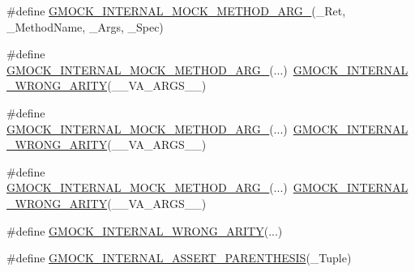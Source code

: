 \begin{DoxyCompactItemize}
\item 
\#define \mbox{\hyperlink{_obj__test_2lib_2googletest-master_2googlemock_2include_2gmock_2gmock-function-mocker_8h_ad8a2523f8167f8c85b082c8c65f31b87}{G\+M\+O\+C\+K\+\_\+\+I\+N\+T\+E\+R\+N\+A\+L\+\_\+\+M\+O\+C\+K\+\_\+\+M\+E\+T\+H\+O\+D\+\_\+\+A\+R\+G\+\_}}(\+\_\+\+Ret,  \+\_\+\+Method\+Name,  \+\_\+\+Args,  \+\_\+\+Spec)
\item 
\#define \mbox{\hyperlink{_obj__test_2lib_2googletest-master_2googlemock_2include_2gmock_2gmock-function-mocker_8h_a761ee1701ece858571b5d950cb6de86a}{G\+M\+O\+C\+K\+\_\+\+I\+N\+T\+E\+R\+N\+A\+L\+\_\+\+M\+O\+C\+K\+\_\+\+M\+E\+T\+H\+O\+D\+\_\+\+A\+R\+G\+\_}}(...)~\mbox{\hyperlink{_obj__test_2lib_2googletest-master_2googlemock_2include_2gmock_2gmock-function-mocker_8h_a592456f4bfcfc9a9a3a6b1482ed569f4}{G\+M\+O\+C\+K\+\_\+\+I\+N\+T\+E\+R\+N\+A\+L\+\_\+\+W\+R\+O\+N\+G\+\_\+\+A\+R\+I\+TY}}(\+\_\+\+\_\+\+V\+A\+\_\+\+A\+R\+G\+S\+\_\+\+\_\+)
\item 
\#define \mbox{\hyperlink{_obj__test_2lib_2googletest-master_2googlemock_2include_2gmock_2gmock-function-mocker_8h_a63f6315200efc8b74271ae1a41d22efd}{G\+M\+O\+C\+K\+\_\+\+I\+N\+T\+E\+R\+N\+A\+L\+\_\+\+M\+O\+C\+K\+\_\+\+M\+E\+T\+H\+O\+D\+\_\+\+A\+R\+G\+\_}}(...)~\mbox{\hyperlink{_obj__test_2lib_2googletest-master_2googlemock_2include_2gmock_2gmock-function-mocker_8h_a592456f4bfcfc9a9a3a6b1482ed569f4}{G\+M\+O\+C\+K\+\_\+\+I\+N\+T\+E\+R\+N\+A\+L\+\_\+\+W\+R\+O\+N\+G\+\_\+\+A\+R\+I\+TY}}(\+\_\+\+\_\+\+V\+A\+\_\+\+A\+R\+G\+S\+\_\+\+\_\+)
\item 
\#define \mbox{\hyperlink{_obj__test_2lib_2googletest-master_2googlemock_2include_2gmock_2gmock-function-mocker_8h_a6d021b39d45073a431b4bc97f8173d70}{G\+M\+O\+C\+K\+\_\+\+I\+N\+T\+E\+R\+N\+A\+L\+\_\+\+M\+O\+C\+K\+\_\+\+M\+E\+T\+H\+O\+D\+\_\+\+A\+R\+G\+\_}}(...)~\mbox{\hyperlink{_obj__test_2lib_2googletest-master_2googlemock_2include_2gmock_2gmock-function-mocker_8h_a592456f4bfcfc9a9a3a6b1482ed569f4}{G\+M\+O\+C\+K\+\_\+\+I\+N\+T\+E\+R\+N\+A\+L\+\_\+\+W\+R\+O\+N\+G\+\_\+\+A\+R\+I\+TY}}(\+\_\+\+\_\+\+V\+A\+\_\+\+A\+R\+G\+S\+\_\+\+\_\+)
\item 
\#define \mbox{\hyperlink{_obj__test_2lib_2googletest-master_2googlemock_2include_2gmock_2gmock-function-mocker_8h_a592456f4bfcfc9a9a3a6b1482ed569f4}{G\+M\+O\+C\+K\+\_\+\+I\+N\+T\+E\+R\+N\+A\+L\+\_\+\+W\+R\+O\+N\+G\+\_\+\+A\+R\+I\+TY}}(...)
\item 
\#define \mbox{\hyperlink{_obj__test_2lib_2googletest-master_2googlemock_2include_2gmock_2gmock-function-mocker_8h_a0cd5db518de5d6abfbafe24d19a35362}{G\+M\+O\+C\+K\+\_\+\+I\+N\+T\+E\+R\+N\+A\+L\+\_\+\+A\+S\+S\+E\+R\+T\+\_\+\+P\+A\+R\+E\+N\+T\+H\+E\+S\+IS}}(\+\_\+\+Tuple)

\end{DoxyCompactItemize}

